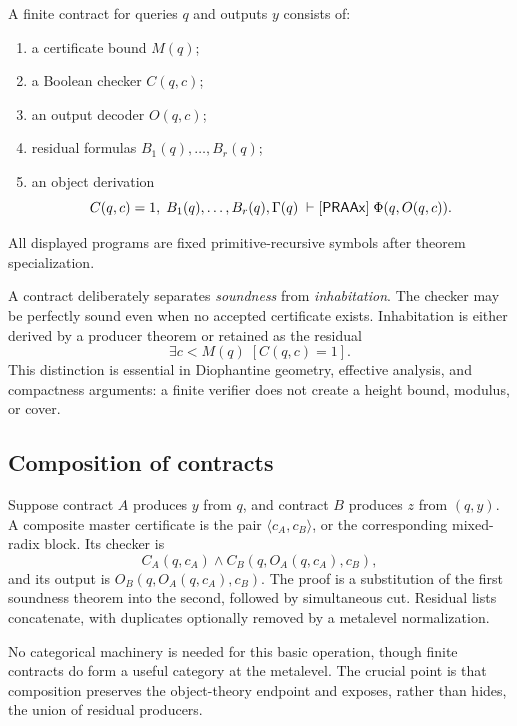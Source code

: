 \begin{definition}
A finite contract for queries \(q\) and outputs \(y\) consists of:
\begin{enumerate}[label=(\roman*),leftmargin=2.3em]
\item a certificate bound \(M(q)\);
\item a Boolean checker \(C(q,c)\);
\item an output decoder \(O(q,c)\);
\item residual formulas \(B_1(q),\ldots,B_r(q)\);
\item an object derivation
\[
  C(q,c)=1,\;B_1(q),\ldots,B_r(q),\Gamma(q)
  \;\vdash[\mathsf{PRAAx}]\;\Phi(q,O(q,c)).
\]
\end{enumerate}
All displayed programs are fixed primitive-recursive symbols after theorem specialization.
\end{definition}

A contract deliberately separates \emph{soundness} from \emph{inhabitation}.  The checker may be perfectly sound even when no accepted certificate exists.  Inhabitation is either derived by a producer theorem or retained as the residual
\begin{equation}
  \exists c<M(q)\;[C(q,c)=1].
  \label{eq:certificate-exists}
\end{equation}
This distinction is essential in Diophantine geometry, effective analysis, and compactness arguments: a finite verifier does not create a height bound, modulus, or cover.

\subsection{Composition of contracts}

Suppose contract \(A\) produces \(y\) from \(q\), and contract \(B\) produces \(z\) from \((q,y)\).  A composite master certificate is the pair \(\langle c_A,c_B\rangle\), or the corresponding mixed-radix block.  Its checker is
\[
 C_A(q,c_A)\wedge C_B(q,O_A(q,c_A),c_B),
\]
and its output is \(O_B(q,O_A(q,c_A),c_B)\).  The proof is a substitution of the first soundness theorem into the second, followed by simultaneous cut.  Residual lists concatenate, with duplicates optionally removed by a metalevel normalization.

No categorical machinery is needed for this basic operation, though finite contracts do form a useful category at the metalevel.  The crucial point is that composition preserves the object-theory endpoint and exposes, rather than hides, the union of residual producers.
